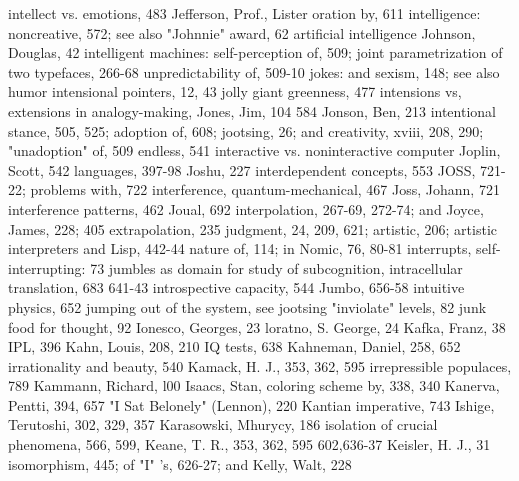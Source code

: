 intellect vs. emotions, 483                       Jefferson, Prof., Lister oration by, 611
intelligence: noncreative, 572; see also           "Johnnie" award, 62
  artificial intelligence                         Johnson, Douglas, 42
intelligent machines: self-perception of, 509;    joint parametrization of two typefaces, 266-68
  unpredictability of, 509-10                     jokes: and sexism, 148; see also humor
intensional pointers, 12, 43                      jolly giant greenness, 477
intensions vs, extensions in analogy-making,      Jones, Jim, 104
  584                                             Jonson, Ben, 213
intentional stance, 505, 525; adoption of, 608;   jootsing, 26; and creativity, xviii, 208, 290;
  "unadoption" of, 509                             endless, 541
interactive vs. noninteractive computer           Joplin, Scott, 542
  languages, 397-98                               Joshu, 227
interdependent concepts, 553                      JOSS, 721-22; problems with, 722
interference, quantum-mechanical, 467             Joss, Johann, 721
interference patterns, 462                        Joual, 692
interpolation, 267-69, 272-74; and                Joyce, James, 228; 405
  extrapolation, 235                              judgment, 24, 209, 621; artistic, 206; artistic
interpreters and Lisp, 442-44                      nature of, 114; in Nomic, 76, 80-81
interrupts, self-interrupting: 73                 jumbles as domain for study of subcognition,
intracellular translation, 683                     641-43
introspective capacity, 544                       Jumbo, 656-58
intuitive physics, 652                            jumping out of the system, see jootsing
"inviolate" levels, 82                            junk food for thought, 92
Ionesco, Georges, 23
loratno, S. George, 24                            Kafka, Franz, 38
IPL, 396                                          Kahn, Louis, 208, 210
IQ tests, 638                                     Kahneman, Daniel, 258, 652
irrationality and beauty, 540                     Kamack, H. J., 353, 362, 595
irrepressible populaces, 789                      Kammann, Richard, l00
Isaacs, Stan, coloring scheme by, 338, 340        Kanerva, Pentti, 394, 657
"I Sat Belonely" (Lennon), 220                    Kantian imperative, 743
Ishige, Terutoshi, 302, 329, 357                  Karasowski, Mhurycy, 186
isolation of crucial phenomena, 566, 599,         Keane, T. R., 353, 362, 595
  602,636-37                                      Keisler, H. J., 31
isomorphism, 445; of "I" 's, 626-27; and          Kelly, Walt, 228
